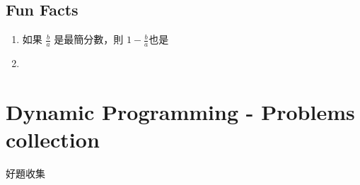 \documentclass[10pt,oneside]{article}
\begin{document}
\begin{landscape}
\begin{multicols}{2}
\subsection{Fun Facts}

\begin{enumerate}
	\item 如果 $\frac b a$ 是最簡分數，則 $1 - \frac b a$也是%
	\item 
\end{enumerate}


\section{Dynamic Programming - Problems collection}

好題收集





\end{multicols}
\end{landscape}
\end{document}
